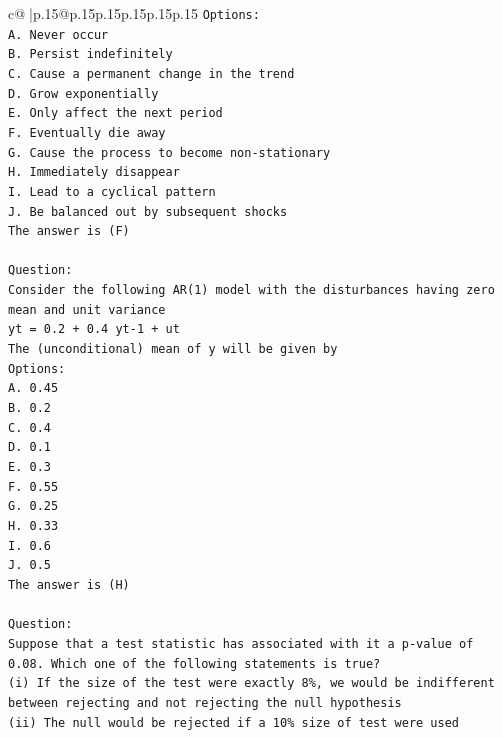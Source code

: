 \documentclass{article}
\begin{document}
{\begin{supertabular}{c@{$\;$}|p{.15\linewidth}@{}p{.15\linewidth}p{.15\linewidth}p{.15\linewidth}p{.15\linewidth}p{.15\linewidth}}
{{{\texttt{Options:} \\
\texttt{A. Never occur} \\
\texttt{B. Persist indefinitely} \\
\texttt{C. Cause a permanent change in the trend} \\
\texttt{D. Grow exponentially} \\
\texttt{E. Only affect the next period} \\
\texttt{F. Eventually die away} \\
\texttt{G. Cause the process to become non{-}stationary} \\
\texttt{H. Immediately disappear} \\
\texttt{I. Lead to a cyclical pattern} \\
\texttt{J. Be balanced out by subsequent shocks} \\
\texttt{The answer is (F)} \\
\\ 
\texttt{Question:} \\
\texttt{Consider the following AR(1) model with the disturbances having zero mean and unit variance} \\
\texttt{yt = 0.2 + 0.4 yt{-}1 + ut} \\
\texttt{The (unconditional) mean of y will be given by} \\
\texttt{Options:} \\
\texttt{A. 0.45} \\
\texttt{B. 0.2} \\
\texttt{C. 0.4} \\
\texttt{D. 0.1} \\
\texttt{E. 0.3} \\
\texttt{F. 0.55} \\
\texttt{G. 0.25} \\
\texttt{H. 0.33} \\
\texttt{I. 0.6} \\
\texttt{J. 0.5} \\
\texttt{The answer is (H)} \\
\\ 
\texttt{Question:} \\
\texttt{Suppose that a test statistic has associated with it a p{-}value of 0.08. Which one of the following statements is true?} \\
\texttt{(i) If the size of the test were exactly 8\%, we would be indifferent between rejecting and not rejecting the null hypothesis} \\
\texttt{(ii) The null would be rejected if a 10\% size of test were used} \\
}}}
\end{supertabular}}
\end{document}
